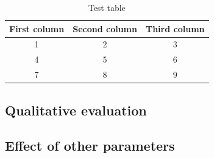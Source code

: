 \begin{table}
  \centering
  \begin{tabular}{||c||c||c||}
    \hline
    First column & Second column & Third column \\ [0.5ex] 
    \hline\hline
    1 & 2 & 3 \\ 
    \hline
    4 & 5 & 6 \\ 
    \hline
    7 & 8 & 9 \\ [1ex]
    \hline
  \end{tabular}
  \caption{Test table}
  \label{table:my_test_table}
\end{table}


\Blindtext[1][1]





\subsection{Qualitative evaluation}
\label{sec:qual_eval}

\Blindtext[2][1]





\subsection{Effect of other parameters}
\label{sec:concepts:sec2}

\Blindtext[2][1]
